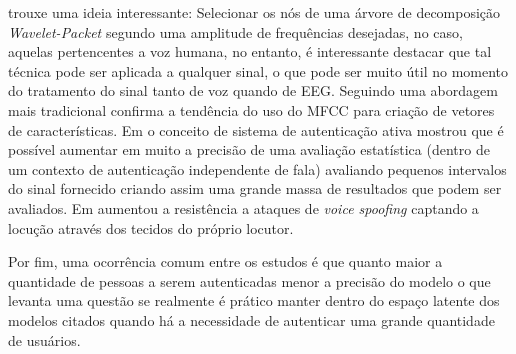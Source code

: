 \cite{math11194205} trouxe uma ideia interessante: Selecionar os nós de uma árvore de decomposição \textit{Wavelet-Packet} segundo uma amplitude de frequências desejadas, no caso, aquelas pertencentes a voz humana, no entanto, é interessante destacar que tal técnica pode ser aplicada a qualquer sinal, o que pode ser muito útil no momento do tratamento do sinal tanto de voz quando de EEG. Seguindo uma abordagem mais tradicional \cite{ali2022speech} confirma a tendência do uso do MFCC para criação de vetores de características. Em \cite{WOS:000525844000004} o conceito de sistema de autenticação ativa mostrou que é possível aumentar em muito a precisão de uma avaliação estatística (dentro de um contexto de autenticação independente de fala) avaliando pequenos intervalos do sinal fornecido criando assim uma grande massa de resultados que podem ser avaliados. Em \cite{10.1145/3448113} aumentou a resistência a ataques de \textit{voice spoofing} captando a locução através dos tecidos do próprio locutor.
			
			\par Por fim, uma ocorrência comum entre os estudos é que quanto maior a quantidade de pessoas a serem autenticadas menor a precisão do modelo o que levanta uma questão se realmente é prático manter dentro do espaço latente dos modelos citados quando há a necessidade de autenticar uma grande quantidade de usuários.
			